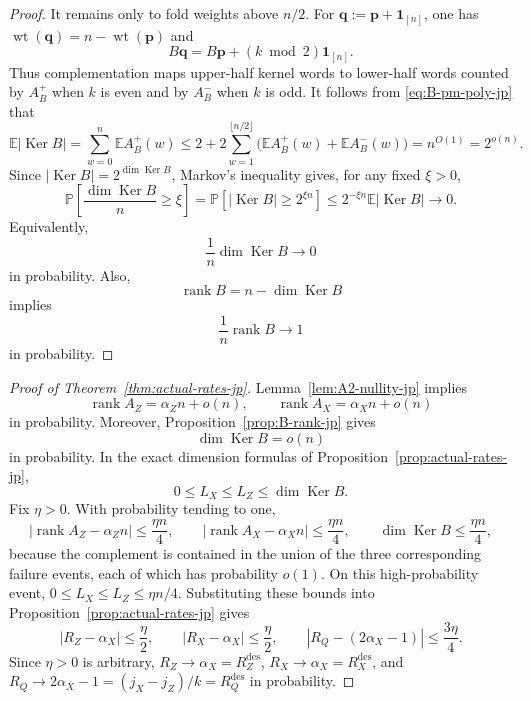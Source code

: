 \documentclass[11pt]{article}
\theoremstyle{definition}
\newcommand{\EE}{\mathbb E}
\newcommand{\PP}{\mathbb P}
\newcommand{\rank}{\operatorname{rank}}
\newcommand{\wt}{\operatorname{wt}}
\newcommand{\Ker}{\operatorname{Ker}}
\newcommand{\bp}{\mathbf p}
\newcommand{\bq}{\mathbf q}
\newcommand{\ones}{\mathbf 1}
\begin{document}
\begin{proof}
It remains only to fold weights above \(n/2\). For
\(\bq:=\bp+\ones_{[n]}\), one has \(\wt(\bq)=n-\wt(\bp)\) and
\[
B\bq=B\bp+(k\bmod2)\ones_{[n]}.
\]
Thus complementation maps upper-half kernel words to lower-half words counted by
\(A_B^+\) when \(k\) is even and by \(A_B^-\) when \(k\) is odd. It follows from
\eqref{eq:B-pm-poly-jp} that
\[
\EE|\Ker B|
=\sum_{w=0}^n\EE A_B^+(w)
\le 2+2\sum_{w=1}^{\lfloor n/2\rfloor}
\bigl(\EE A_B^+(w)+\EE A_B^-(w)\bigr)
=n^{O(1)}=2^{o(n)}.
\]
Since \(|\Ker B|=2^{\dim\Ker B}\), Markov's inequality gives, for any fixed \(\xi>0\),
\begin{equation*}
\PP\!\left[\frac{\dim\Ker B}{n}\ge \xi\right]
=
\PP\!\left[|\Ker B|\ge 2^{\xi n}\right]
\le
2^{-\xi n}\EE|\Ker B|
\to 0.
\end{equation*}
Equivalently,
\begin{equation*}
\frac1n\dim\Ker B\to 0
\end{equation*}
in probability.
Also,
\begin{equation*}
\rank B=n-\dim\Ker B
\end{equation*}
implies
\begin{equation*}
\frac1n\rank B\to 1
\end{equation*}
in probability.
\end{proof}

\begin{proof}[Proof of Theorem~\ref{thm:actual-rates-jp}]
Lemma~\ref{lem:A2-nullity-jp} implies
\begin{equation*}
\rank A_Z = \alpha_Z n + o(n),
\qquad
\rank A_X = \alpha_X n + o(n)
\end{equation*}
in probability.
Moreover, Proposition~\ref{prop:B-rank-jp} gives
\begin{equation*}
\dim\Ker B = o(n)
\end{equation*}
in probability.
In the exact dimension formulas of Proposition~\ref{prop:actual-rates-jp},
\[
0\le L_X\le L_Z\le \dim\Ker B.
\]
Fix \(\eta>0\). With probability tending to one,
\[
|\rank A_Z-\alpha_Z n|\le \frac{\eta n}{4},\qquad
|\rank A_X-\alpha_X n|\le \frac{\eta n}{4},\qquad
\dim\Ker B\le \frac{\eta n}{4},
\]
because the complement is contained in the union of the three corresponding failure events, each of which has probability \(o(1)\). On this high-probability event, \(0\le L_X\le L_Z\le\eta n/4\). Substituting these bounds into Proposition~\ref{prop:actual-rates-jp} gives
\begin{equation*}
|R_Z-\alpha_X|\le \frac{\eta}{2},
\qquad
|R_X-\alpha_X|\le \frac{\eta}{2},
\qquad
|R_Q-(2\alpha_X-1)|\le \frac{3\eta}{4}.
\end{equation*}
Since \(\eta>0\) is arbitrary, \(R_Z\to\alpha_X=R_Z^{\mathrm{des}}\), \(R_X\to\alpha_X=R_X^{\mathrm{des}}\), and \(R_Q\to2\alpha_X-1=(j_X-j_Z)/k=R_Q^{\mathrm{des}}\) in probability.
\end{proof}
\end{document}
